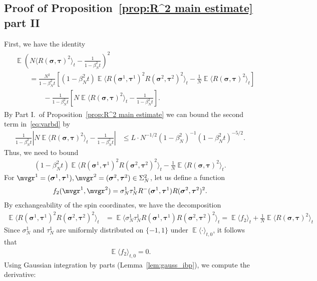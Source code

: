\documentclass[letterpaper,11pt,reqno]{amsart}
\renewcommand{\leq}{\leqslant}
\newcommand{\ra}{\rangle}
\newcommand{\la}{\langle}
\newcommand{\abs}[1]{\left\vert#1\right\vert}
\newcommand{\mvgs}{\boldsymbol{\sigma}}\newcommand{\mvgS}{\boldsymbol{\Sigma}}\newcommand{\mvgt}{\boldsymbol{\tau}}
\DeclareMathOperator{\E}{\mathds{E}}
\begin{document}
\subsection{Proof of Proposition~\ref{prop:R^2 main estimate} part II}
First, we have the identity
\begin{align}\label{eq:varbd}
\begin{split}
    &\E \left( N \la R(\mvgs, \mvgt)^2 \ra_{t} - \frac{1}{1-\beta_N^2 t} \right)^2\\
    &\qquad= \frac{N^2}{1-\beta_N^2 t}\left[ (1-\beta_N^2 t)\E \la R(\mvgs^1, \mvgt^1)^2 R(\mvgs^2, \mvgt^2)^2 \ra_{t}  - \frac{1}{N} \E \la R(\mvgs, \mvgt)^2 \ra_{t} \right] \\
    &\qquad\qquad - \frac{1}{1-\beta^2_N t} \left[ N\E \la R(\mvgs, \mvgt)^2 \ra_{t} - \frac{1}{1-\beta_N^2 t} \right].
    \end{split}
\end{align}
By  Part I.~of Proposition~\ref{prop:R^2 main estimate} we can bound the second term in~\eqref{eq:varbd} by
\begin{align*}
\frac{1}{1-\beta^2_N t} \abs{ N \E \la R(\mvgs, \mvgt)^2\ra_{t} - \frac{1}{1-\beta_N^2 t} }
        &\leq L \cdot N^{-1/2} (1-\beta_N^2)^{-1} (1-\beta_N^2 t)^{-5/2}.
\end{align*}
Thus, we need to bound
\begin{align}\label{eq:var2bd}
(1-\beta_N^2 t)\E \la R(\mvgs^1, \mvgt^1)^2 R(\mvgs^2, \mvgt^2)^2 \ra_{t}  - \frac{1}{N} \E \la R(\mvgs, \mvgt)^2 \ra_{t} .
\end{align}
For \(\mvgr^1=(\mvgs^{1},\mvgt^{1}), \mvgr^2=(\mvgs^{2},\mvgt^{2}) \in \Sigma_{N}^2\), let us define a function
\begin{align*}f_2(\mvgr^1, \mvgr^2) = \sigma_N^1 \tau_N^1 R^-(\mvgs^1, \mvgt^1) R(\mvgs^2, \mvgt^2)^2.\end{align*}
By exchangeability of the spin coordinates, we have the decomposition
\begin{align*}
    \E \la R(\mvgs^1, \mvgt^1)^2 R(\mvgs^2, \mvgt^2)^2 \ra_{t}
    &= \E \la \sigma_N^1 \tau_N^1  R(\mvgs^1, \mvgt^1) R(\mvgs^2, \mvgt^2)^2 \ra_{t} 
    = \E \la f_2 \ra_{t} + \frac{1}{N} \E \la R(\mvgs, \mvgt)^2 \ra_{t}
\end{align*}
Since \(\sigma_N^1\) and \(\tau_N^1\) are uniformly distributed on \(\{-1,1\}\) under \(\E \la \cdot \ra_{t,0}\), it follows that
\begin{align*}
    \E \la f_2 \ra_{t,0} = 0.
\end{align*}
Using Gaussian integration by parts (Lemma~\ref{lem:gauss_ibp}), we compute the derivative:
\end{document}
